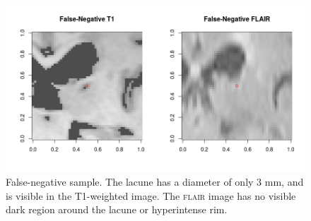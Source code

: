 \begin{figure}[ht]
\centering
\includegraphics[width=\linewidth]{Images/7_FN_t1_flair.png}
\caption{\small{False-negative sample. The lacune has a diameter of only 3 mm, and is visible in the T1-weighted image. The \textsc{flair} image has no visible dark region around the lacune or hyperintense rim.}}
\label{results-fn}
\end{figure}

